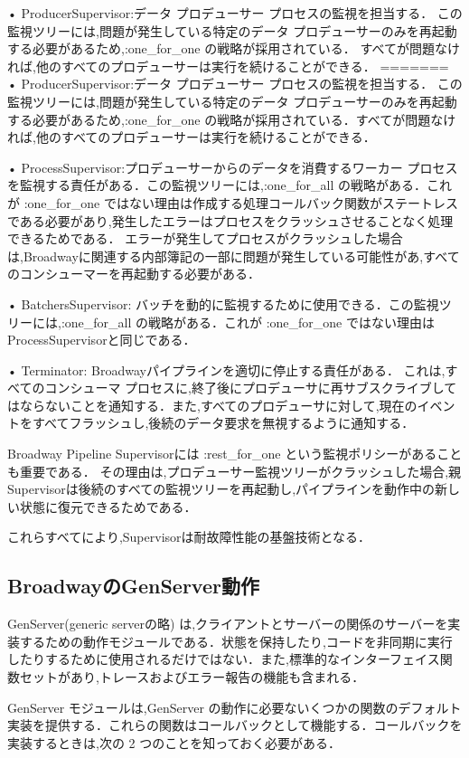 \documentclass[a4paper]{jreport}	%
\begin{document}
• ProducerSupervisor:データ プロデューサー プロセスの監視を担当する． この監視ツリーには,問題が発生している特定のデータ プロデューサーのみを再起動する必要があるため,:one\_for\_one の戦略が採用されている． すべてが問題なければ,他のすべてのプロデューサーは実行を続けることができる．
=======
• ProducerSupervisor:データ プロデューサー プロセスの監視を担当する． この監視ツリーには,問題が発生している特定のデータ プロデューサーのみを再起動する必要があるため,:one\_for\_one の戦略が採用されている．すべてが問題なければ,他のすべてのプロデューサーは実行を続けることができる．


• ProcessSupervisor:プロデューサーからのデータを消費するワーカー プロセスを監視する責任がある．この監視ツリーには,:one\_for\_all の戦略がある．これが :one\_for\_one ではない理由は作成する処理コールバック関数がステートレスである必要があり,発生したエラーはプロセスをクラッシュさせることなく処理できるためである． エラーが発生してプロセスがクラッシュした場合は,Broadwayに関連する内部簿記の一部に問題が発生している可能性があ,すべてのコンシューマーを再起動する必要がある．

• BatchersSupervisor: バッチを動的に監視するために使用できる．この監視ツリーには,:one\_for\_all の戦略がある．これが :one\_for\_one ではない理由はProcessSupervisorと同じである．

• Terminator: Broadwayパイプラインを適切に停止する責任がある． これは,すべてのコンシューマ プロセスに,終了後にプロデューサに再サブスクライブしてはならないことを通知する．また,すべてのプロデューサに対して,現在のイベントをすべてフラッシュし,後続のデータ要求を無視するように通知する．

Broadway Pipeline Supervisorには :rest\_for\_one という監視ポリシーがあることも重要である． その理由は,プロデューサー監視ツリーがクラッシュした場合,親Supervisorは後続のすべての監視ツリーを再起動し,パイプラインを動作中の新しい状態に復元できるためである．


これらすべてにより,Supervisorは耐故障性能の基盤技術となる．

\subsection{BroadwayのGenServer動作}
GenServer(generic serverの略) は,クライアントとサーバーの関係のサーバーを実装するための動作モジュールである．状態を保持したり,コードを非同期に実行したりするために使用されるだけではない．また,標準的なインターフェイス関数セットがあり,トレースおよびエラー報告の機能も含まれる\cite{M}．

GenServer モジュールは,GenServer の動作に必要ないくつかの関数のデフォルト実装を提供する．これらの関数はコールバックとして機能する．コールバックを実装するときは,次の 2 つのことを知っておく必要がある．
\end{document}

